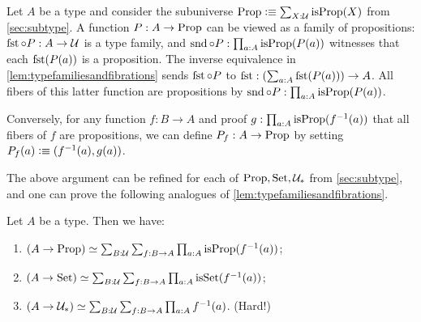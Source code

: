 \begin{definition}
Let $A$ be a type and consider the subuniverse 
$\Prop\defeq \sum_{X:\UU}\isprop(X)$ from \cref{sec:subtype}.
A function $P: A\to\mathrm{Prop}$ can be viewed as a family of propositions:
$\fst\circ P : A\to \UU$ is a type family, and
$\snd\circ P : \prod_{a:A} \isprop(P(a))$ witnesses
that each $\fst(P(a))$ is a proposition.
The inverse equivalence in \cref{lem:typefamiliesandfibrations}
sends $\fst\circ P$ to $\fst: (\sum_{a:A} \fst(P(a))) \to A$.
All fibers of this latter function are propositions by
$\snd\circ P : \prod_{a:A} \isprop(P(a))$. 

Conversely,
for any function $f: B\to A$ and proof 
$g:\prod_{a:A} \mathrm{isProp}(f^{-1}(a))$ that all fibers of $f$
are propositions,
we can define $P_f : A\to\mathrm{Prop}$ by setting $P_f(a)\defeq (f^{-1}(a),g(a))$.

The above argument can be refined for each of $\mathrm{Prop},\mathrm{Set},{\mathcal{U}_*}$
from \cref{sec:subtype}, and one can prove the following
analogues of \cref{lem:typefamiliesandfibrations}.

\begin{lemma}\label{lem:Prop-Set-pointed-families}
Let $A$ be a type. Then we have:
\begin{enumerate}
\item $(A\to\mathrm{Prop}) \simeq \sum_{B:{\mathcal{U}}}\sum_{f:B\to A}
\prod_{a:A}\mathrm{isProp}({f^{-1}(a)})$;
\item \label{lem:Set-families}
$(A\to\mathrm{Set}) \simeq \sum_{B:{\mathcal{U}}}\sum_{f:B\to A}
\prod_{a:A}\mathrm{isSet}({f^{-1}(a)})$;
\item $(A\to{\mathcal{U}_*}) \simeq \sum_{B:{\mathcal{U}}}\sum_{f:B\to A}
\prod_{a:A}f^{-1}(a)$. (Hard!)
\end{enumerate}
\end{lemma}







\end{definition}
